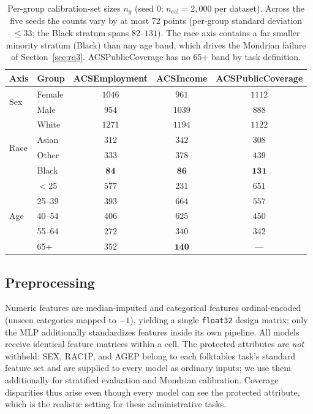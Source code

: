 \documentclass[review,12pt]{elsarticle}
\begin{document}
\begin{table}[t]
\centering
\caption{Per-group calibration-set sizes $n_g$ (seed 0; $n_{\mathrm{cal}}=2{,}000$ per dataset). Across the five seeds the counts vary by at most $72$ points (per-group standard deviation $\le 33$; the Black stratum spans $82$--$131$). The race axis contains a far smaller minority stratum (Black) than any age band, which drives the Mondrian failure of Section~\ref{sec:rq3}. ACSPublicCoverage has no 65+ band by task definition.}
\label{tab:groupsizes}
\small
\begin{tabular}{llccc}
\toprule
Axis & Group & ACSEmployment & ACSIncome & ACSPublicCoverage \\
\midrule
\multirow{2}{*}{Sex}  & Female & $1046$ & $961$  & $1112$ \\
                      & Male   & $954$  & $1039$ & $888$  \\
\midrule
\multirow{4}{*}{Race} & White  & $1271$ & $1194$ & $1122$ \\
                      & Asian  & $312$  & $342$  & $308$  \\
                      & Other  & $333$  & $378$  & $439$  \\
                      & Black  & $\mathbf{84}$ & $\mathbf{86}$ & $\mathbf{131}$ \\
\midrule
\multirow{5}{*}{Age}  & $<$25  & $577$  & $231$  & $651$  \\
                      & 25--39 & $393$  & $664$  & $557$  \\
                      & 40--54 & $406$  & $625$  & $450$  \\
                      & 55--64 & $272$  & $340$  & $342$  \\
                      & 65+    & $352$  & $\mathbf{140}$ & --- \\
\bottomrule
\end{tabular}
\end{table}

\subsection{Preprocessing}
Numeric features are median-imputed and categorical features ordinal-encoded (unseen categories mapped to $-1$), yielding a single \texttt{float32} design matrix; only the MLP additionally standardizes features inside its own pipeline. All models receive identical feature matrices within a cell. The protected attributes are \emph{not} withheld: SEX, RAC1P, and AGEP belong to each folktables task's standard feature set and are supplied to every model as ordinary inputs; we use them additionally for stratified evaluation and Mondrian calibration. Coverage disparities thus arise even though every model can see the protected attribute, which is the realistic setting for these administrative tasks.
\end{document}
